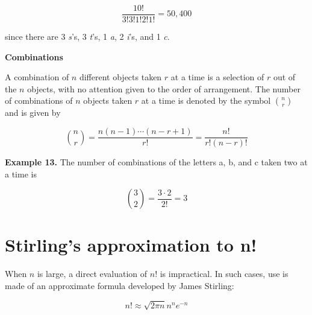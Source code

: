 \documentclass[
]{article}
\begin{document}
\[
\frac{10!}{3! 3! 1! 2! 1!} = 50, 400
\]

since there are 3 \emph{s}'s, 3 \emph{t}'s, 1 \emph{a}, 2 \emph{i}'s,
and 1 \emph{c}.

\textbf{Combinations}

A combination of \(n\) different objects taken \(r\) at a time is a
selection of \(r\) out of the \(n\) objects, with no attention given to
the order of arrangement. The number of combinations of \(n\) objects
taken \(r\) at a time is denoted by the symbol \(\binom{n}{r}\) and is
given by

\begin{equation}
\binom{n}{r} = \frac{n (n - 1) \cdots (n - r + 1)}{r!} = \frac{n!}{r! (n-r)!}
\end{equation}

\textbf{Example 13.} The number of combinations of the letters a, b, and
c taken two at a time is

\[
\binom{3}{2} = \frac{3 \cdot 2}{2!} = 3
\]

\hypertarget{stirlings-approximation-to-n}{%
\section{Stirling's approximation to
n!}\label{stirlings-approximation-to-n}}

When \(n\) is large, a direct evaluation of \(n!\) is impractical. In
such cases, use is made of an approximate formula developed by James
Stirling:

\begin{equation}
n! \approx \sqrt{2 \pi n} n^n e^{-n}
\end{equation}
\end{document}
